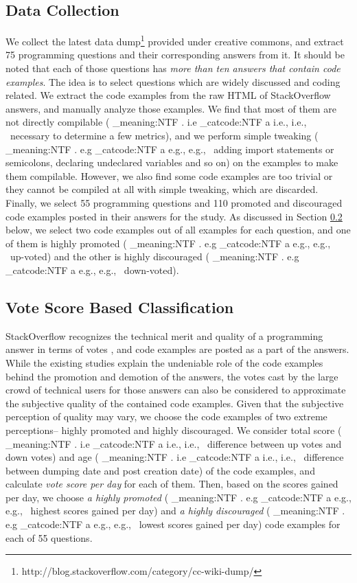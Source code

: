 \documentclass{sig-alternate}
\makeatletter
\newcommand\latinabbrev[1]{
  \peek_meaning:NTF . {%
    #1\@}%
  { \peek_catcode:NTF a {%
      #1., \@ }%
    {#1., \@}}}
\def\eg{\latinabbrev{e.g}}
\def\ie{\latinabbrev{i.e}}
\makeatother
\begin{document}
\subsection{Data Collection}
We collect the latest data dump\footnote{http://blog.stackoverflow.com/category/cc-wiki-dump/} provided under creative commons, and extract 75 programming questions and their corresponding answers from it. It should be noted that each of those questions has \emph{more than ten answers that contain code examples}. The idea is to select questions which are widely discussed and coding related. We extract the code examples from the raw HTML of StackOverflow answers, and manually analyze those examples. We find that most of them are not directly compilable (\ie\ necessary to determine a few metrics), and we perform simple tweaking (\eg\ adding import statements or semicolons, declaring undeclared variables and so on) on the examples to make them compilable. However, we also find some code examples are too trivial or they cannot be compiled at all with simple tweaking, which are discarded. Finally, we select 55 programming questions and 110 promoted and discouraged code examples posted in their answers for the study. As discussed in Section \ref{sec:voteclass} below, we select two code examples out of all examples for each question, and one of them is highly promoted (\eg\ up-voted) and the other is highly discouraged (\eg\ down-voted).
\vspace{-.1cm}
\subsection{Vote Score Based Classification}\label{sec:voteclass}
StackOverflow recognizes the technical merit and quality of a programming answer in terms of votes \cite{nasehi}, and code examples are posted as a part of the answers. While the existing studies \cite{nasehi, nier} explain the undeniable role of the code examples behind the promotion and demotion of the answers, the votes cast by the large crowd of technical users for those answers can also be considered to approximate the subjective quality of the contained code examples. Given that the subjective perception of quality may vary, we choose the code examples of two extreme perceptions-- highly promoted and highly discouraged. We consider total score (\ie\ difference between up votes and down votes) and age (\ie\ difference between dumping date and post creation date) of the code examples, and calculate \emph{vote score per day} for each of them. Then, based on the scores gained per day, we choose \emph{a highly promoted} (\eg\ highest scores gained per day) and \emph{a highly discouraged} (\eg\ lowest scores gained per day) code examples for each of 55 questions. 
\vspace{-.1cm}
\end{document}
